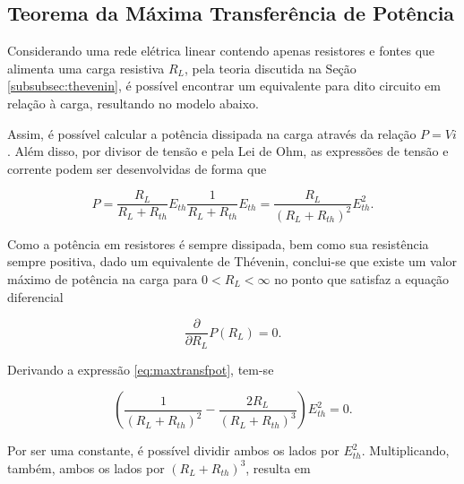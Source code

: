 \documentclass{article}
\numberwithin{equation}{section}
\begin{document}
\subsection{Teorema da Máxima Transferência de Potência}
\label{subsec:maxpot}

Considerando uma rede elétrica linear contendo apenas resistores e fontes que alimenta uma carga resistiva $R_L$, pela teoria discutida na Seção \ref{subsubsec:thevenin}, é possível encontrar um equivalente para dito circuito em relação à carga, resultando no modelo abaixo.

\begin{center}
\end{center}

\noindent Assim, é possível calcular a potência dissipada na carga através da relação $P = Vi$. Além disso, por divisor de tensão e pela Lei de Ohm, as expressões de tensão e corrente podem ser desenvolvidas de forma que

\begin{equation}
    P = \dfrac{R_L}{R_L+R_{th}}E_{th} \dfrac{1}{R_L+R_{th}}E_{th} = \dfrac{R_L}{(R_L+R_{th})^2}E_{th}^2. \label{eq:maxtransfpot}
\end{equation}

\noindent Como a potência em resistores é sempre dissipada, bem como sua resistência sempre positiva, dado um equivalente de Thévenin, conclui-se que existe um valor máximo de potência na carga para $0 < R_L < \infty$ no ponto que satisfaz a equação diferencial

\begin{equation*}
    \dfrac{\partial}{\partial R_L}P(R_L) = 0.
\end{equation*}

\noindent Derivando a expressão \eqref{eq:maxtransfpot}, tem-se

\begin{equation*}
    \left(\dfrac{1}{(R_L+R_{th})^2} - \dfrac{2R_L}{(R_L+R_{th})^3}\right)E_{th}^2 = 0.
\end{equation*}

\noindent Por ser uma constante, é possível dividir ambos os lados por $E_{th}^2$. Multiplicando, também, ambos os lados por $(R_L+R_{th})^3$, resulta em
\end{document}
